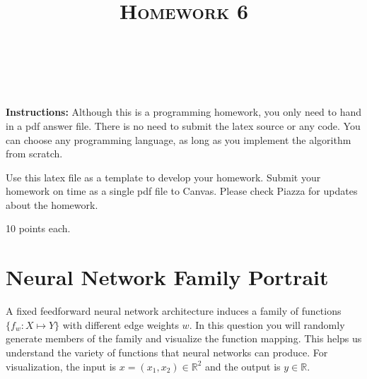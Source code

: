 \documentclass[a4paper]{article}
\title{\textsc{Homework 6}} %
\author{
\red{$>>$NAME HERE$<<$} \\
\red{$>>$ID HERE$<<$}\\
}
\date{}
\theoremstyle{definition}
\def\R{\mathbb R}
\begin{document}
\maketitle 


\textbf{Instructions:} 
Although this is a programming homework, you only need to hand in a pdf answer file.
There is no need to submit the latex source or any code.
You can choose any programming language, as long as you implement the algorithm from scratch. 

Use this latex file as a template to develop your homework.
Submit your homework on time as a single pdf file to Canvas.
Please check Piazza for updates about the homework.

10 points each.

\section{Neural Network Family Portrait}
A fixed feedforward neural network architecture induces a family of functions $\{f_w: X \mapsto Y\}$ with different edge weights $w$.
In this question you will randomly generate members of the family and visualize the function mapping. 
This helps us understand the variety of functions that neural networks can produce. 
For visualization, the input is $x=(x_1, x_2) \in \R^2$ and the output is $y\in\R$.
\end{document}
